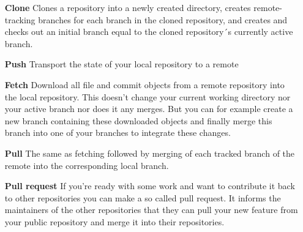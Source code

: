 \documentclass[a4paper,10pt]{scrartcl}
\begin{document}
\begin{itemize}
  \item[\textbf{Clone}] Clones a repository into a newly created directory, creates remote-tracking branches for each branch in the cloned repository, and creates and checks out an initial branch equal to the cloned repository´s currently active branch.
  \item[\textbf{Push}] Transport the state of your local repository to a remote
  \item[\textbf{Fetch}] Download all file and commit objects from a remote repository into the local repository. This doesn't change your current working directory nor your active branch nor does it any merges. But you can for example create a new branch containing these downloaded objects and finally merge this branch into one of your branches to integrate these changes.
  \item[\textbf{Pull}] The same as fetching followed by merging of each tracked branch of the remote into the corresponding local branch.
  \item[\textbf{Pull request}] If you're ready with some work and want to contribute it back to other repositories you can make a so called pull request. It informs the maintainers of the other repositories that they can pull your new feature from your public repository and merge it into their repositories.
\end{itemize}
\end{document}
